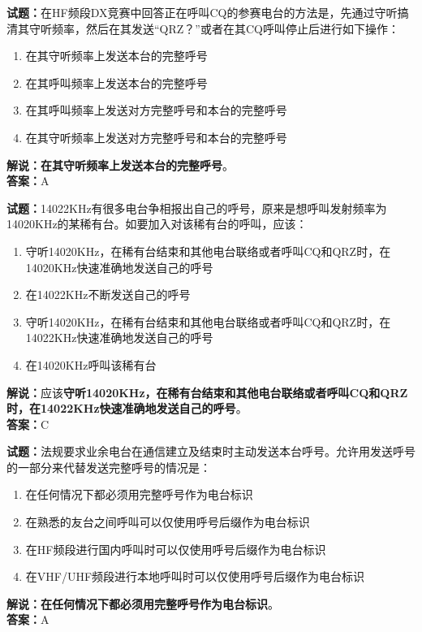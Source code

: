 \documentclass{ctexbook}
\begin{document}
\bigskip




\noindent\textbf{试题：}在HF频段DX竞赛中回答正在呼叫CQ的参赛电台的方法是，先通过守听搞清其守听频率，然后在其发送“QRZ？”或者在其CQ呼叫停止后进行如下操作：
\begin{enumerate}[leftmargin=3em]
\item 在其守听频率上发送本台的完整呼号
\item 在其呼叫频率上发送本台的完整呼号
\item 在其呼叫频率上发送对方完整呼号和本台的完整呼号
\item 在其守听频率上发送对方完整呼号和本台的完整呼号
\end{enumerate}
\noindent\textbf{解说：}\textbf{在其守听频率上发送本台的完整呼号}。\\\noindent\textbf{答案：}A

\bigskip




\noindent\textbf{试题：}14022KHz有很多电台争相报出自己的呼号，原来是想呼叫发射频率为14020KHz的某稀有台。如要加入对该稀有台的呼叫，应该：
\begin{enumerate}[leftmargin=3em]
\item 守听14020KHz，在稀有台结束和其他电台联络或者呼叫CQ和QRZ时，在14020KHz快速准确地发送自己的呼号
\item 在14022KHz不断发送自己的呼号
\item 守听14020KHz，在稀有台结束和其他电台联络或者呼叫CQ和QRZ时，在14022KHz快速准确地发送自己的呼号
\item 在14020KHz呼叫该稀有台
\end{enumerate}
\noindent\textbf{解说：}应该\textbf{守听14020KHz，在稀有台结束和其他电台联络或者呼叫CQ和QRZ时，在14022KHz快速准确地发送自己的呼号}。\\\noindent\textbf{答案：}C

\bigskip




\noindent\textbf{试题：}法规要求业余电台在通信建立及结束时主动发送本台呼号。允许用发送呼号的一部分来代替发送完整呼号的情况是：
\begin{enumerate}[leftmargin=3em]
\item 在任何情况下都必须用完整呼号作为电台标识
\item 在熟悉的友台之间呼叫可以仅使用呼号后缀作为电台标识
\item 在HF频段进行国内呼叫时可以仅使用呼号后缀作为电台标识
\item 在VHF/UHF频段进行本地呼叫时可以仅使用呼号后缀作为电台标识
\end{enumerate}
\noindent\textbf{解说：}\textbf{在任何情况下都必须用完整呼号作为电台标识}。\\\noindent\textbf{答案：}A
\end{document}
